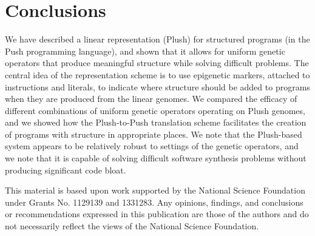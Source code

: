 \documentclass[graybox]{svmult}
\begin{document}


\section{Conclusions}

We have described a linear representation (Plush) for structured programs (in the Push programming language), and shown that it allows for uniform genetic operators that produce meaningful structure while solving difficult problems. The central idea of the representation scheme is to use epigenetic markers, attached to instructions and literals, to indicate where structure should be added to programs when they are produced from the linear genomes. We compared the efficacy of different combinations of uniform genetic operators operating on Plush genomes, and we showed how the Plush-to-Push translation scheme facilitates the creation of programs with structure in appropriate places. We note that the Plush-based system appears to be relatively robust to settings of the genetic operators, and we note that it is capable of solving difficult software synthesis problems without producing significant code bloat.



\begin{acknowledgement}
This material is based upon work supported by the National Science Foundation under Grants No. 1129139 and 1331283. Any opinions, findings, and conclusions or recommendations expressed in this publication are those of the authors and do not necessarily reflect the views of the National Science Foundation.
\end{acknowledgement}


\end{document}
